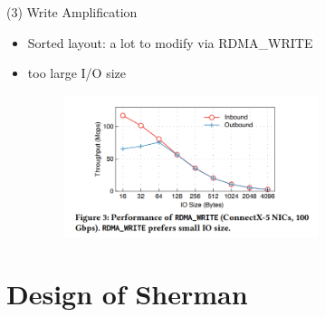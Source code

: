 \documentclass[11pt]{beamer}                                                                                                   %
\begin{document}
\begin{frame}[t]
	(3) Write Amplification
	
	\begin{itemize}
		\item Sorted layout: a lot to modify via RDMA\_WRITE
		\item too large I/O size
		\begin{figure}[ht]%
			\centering  %
			\includegraphics[width=0.7\textwidth]{11.png}  
			
		\end{figure}

		
	\end{itemize}  
	
	
\end{frame}
\section{Design of Sherman}
\end{document}
